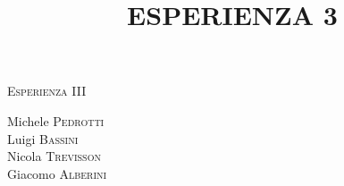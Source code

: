 \documentclass[11pt]{article}
\begin{document}
\begin{center}



\textsc{\Huge Esperienza III}\\[0.5cm]



\large
\title{ESPERIENZA 3}

Michele \textsc{Pedrotti}\\
Luigi \textsc{Bassini}\\
Nicola \textsc{Trevisson}\\
Giacomo \textsc{Alberini}






\end{center}


~\\
\end{document}
